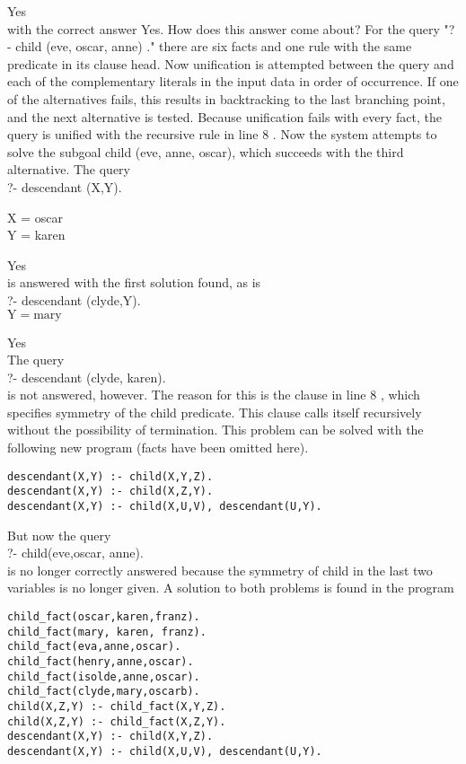 \documentclass[10pt]{article}
\begin{document}
Yes\\
with the correct answer Yes. How does this answer come about? For the query "? - child (eve, oscar, anne) ." there are six facts and one rule with the same predicate in its clause head. Now unification is attempted between the query and each of the complementary literals in the input data in order of occurrence. If one of the alternatives fails, this results in backtracking to the last branching point, and the next alternative is tested. Because unification fails with every fact, the query is unified with the recursive rule in line 8 . Now the system attempts to solve the subgoal child (eve, anne, oscar), which succeeds with the third alternative. The query\\
?- descendant (X,Y).

X = oscar\\
Y = karen

Yes\\
is answered with the first solution found, as is\\
?- descendant (clyde,Y).\\
$\mathrm{Y}=\mathrm{mar} \mathrm{y}$

Yes\\
The query\\
?- descendant (clyde, karen).\\
is not answered, however. The reason for this is the clause in line 8 , which specifies symmetry of the child predicate. This clause calls itself recursively without the possibility of termination. This problem can be solved with the following new program (facts have been omitted here).

\begin{verbatim}
descendant(X,Y) :- child(X,Y,Z).
descendant(X,Y) :- child(X,Z,Y).
descendant(X,Y) :- child(X,U,V), descendant(U,Y).
\end{verbatim}

But now the query\\
?- child(eve,oscar, anne).\\
is no longer correctly answered because the symmetry of child in the last two variables is no longer given. A solution to both problems is found in the program

\begin{verbatim}
child_fact(oscar,karen,franz).
child_fact(mary, karen, franz).
child_fact(eva,anne,oscar).
child_fact(henry,anne,oscar).
child_fact(isolde,anne,oscar).
child_fact(clyde,mary,oscarb).
child(X,Z,Y) :- child_fact(X,Y,Z).
child(X,Z,Y) :- child_fact(X,Z,Y).
descendant(X,Y) :- child(X,Y,Z).
descendant(X,Y) :- child(X,U,V), descendant(U,Y).
\end{verbatim}
\end{document}
